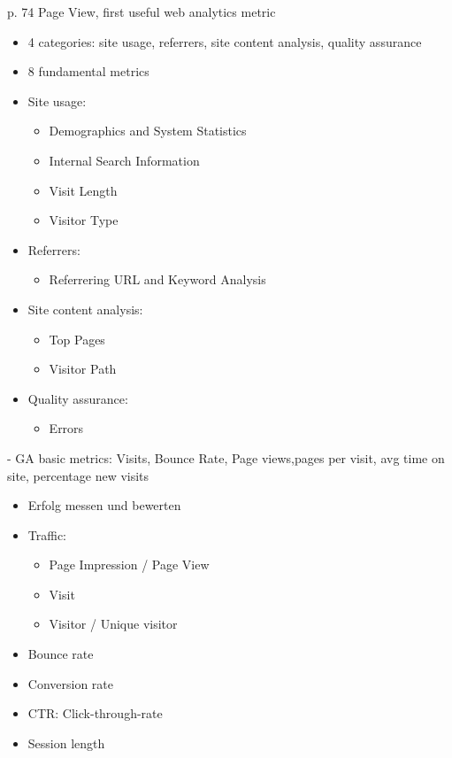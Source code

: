 p. 74 Page View, first useful web analytics metric






\begin{itemize}
\item 4 categories: site usage, referrers, site content analysis, quality assurance
\item 8 fundamental metrics
\item Site usage:
	\begin{itemize}
	\item Demographics and System Statistics
	\item Internal Search Information
	\item Visit Length
	\item Visitor Type
	\end{itemize}
\item Referrers:
	\begin{itemize}
	\item Referrering URL and Keyword Analysis
	\end{itemize}
\item Site content analysis:
	\begin{itemize}
	\item Top Pages
	\item Visitor Path
	\end{itemize}
\item Quality assurance:
	\begin{itemize}
	\item Errors
	\end{itemize}
\end{itemize}



- GA basic metrics: Visits, Bounce Rate, Page views,pages per visit, avg time on site, percentage new visits


\begin{itemize}
\item Erfolg messen und bewerten
\item Traffic:
	\begin{itemize}
	\item Page Impression / Page View
	\item Visit
	\item Visitor / Unique visitor
	\end{itemize}
\item Bounce rate
\item Conversion rate
\item CTR: Click-through-rate
\item Session length
\end{itemize}



